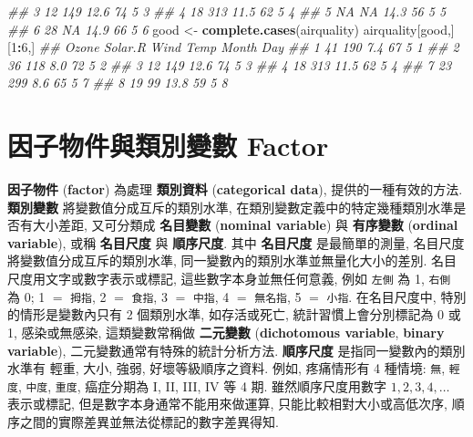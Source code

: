\documentclass[
]{book}
\newenvironment{Shaded}{\begin{snugshade}}{\end{snugshade}}
\newcommand{\CommentTok}[1]{\textcolor[rgb]{0.56,0.35,0.01}{\textit{#1}}}
\newcommand{\DecValTok}[1]{\textcolor[rgb]{0.00,0.00,0.81}{#1}}
\newcommand{\KeywordTok}[1]{\textcolor[rgb]{0.13,0.29,0.53}{\textbf{#1}}}
\newcommand{\NormalTok}[1]{#1}
\newcommand{\OperatorTok}[1]{\textcolor[rgb]{0.81,0.36,0.00}{\textbf{#1}}}
\newcommand{\StringTok}[1]{\textcolor[rgb]{0.31,0.60,0.02}{#1}}
\begin{document}
\begin{Shaded}
\begin{Highlighting}[]
\CommentTok{\#\# 3    12     149 12.6   74     5   3}
\CommentTok{\#\# 4    18     313 11.5   62     5   4}
\CommentTok{\#\# 5    NA      NA 14.3   56     5   5}
\CommentTok{\#\# 6    28      NA 14.9   66     5   6}
\NormalTok{good  \textless{}{-}}\StringTok{  }\KeywordTok{complete.cases}\NormalTok{(airquality)}
\NormalTok{airquality[good,][}\DecValTok{1}\OperatorTok{:}\DecValTok{6}\NormalTok{,]}
\CommentTok{\#\#   Ozone Solar.R Wind Temp Month Day}
\CommentTok{\#\# 1    41     190  7.4   67     5   1}
\CommentTok{\#\# 2    36     118  8.0   72     5   2}
\CommentTok{\#\# 3    12     149 12.6   74     5   3}
\CommentTok{\#\# 4    18     313 11.5   62     5   4}
\CommentTok{\#\# 7    23     299  8.6   65     5   7}
\CommentTok{\#\# 8    19      99 13.8   59     5   8}
\end{Highlighting}
\end{Shaded}

\hypertarget{ux56e0ux5b50ux7269ux4ef6ux8207ux985eux5225ux8b8aux6578-factor}{%
\section{因子物件與類別變數 Factor}\label{ux56e0ux5b50ux7269ux4ef6ux8207ux985eux5225ux8b8aux6578-factor}}

\textbf{因子物件}
(\textbf{factor})
為處理
\textbf{類別資料}
(\textbf{categorical data}),
提供的一種有效的方法.
\textbf{類別變數}
將變數值分成互斥的類別水準,
在類別變數定義中的特定幾種類別水準是否有大小差距,
又可分類成
\textbf{名目變數}
(\textbf{nominal variable})
與
\textbf{有序變數}
(\textbf{ordinal variable}),
或稱
\textbf{名目尺度}
與
\textbf{順序尺度}.
其中
\textbf{名目尺度}
是最簡單的測量,
名目尺度將變數值分成互斥的類別水準,
同一變數內的類別水準並無量化大小的差別.
名目尺度用文字或數字表示或標記, 這些數字本身並無任何意義,
例如 \texttt{左側} 為 1, \texttt{右側} 為 0;
1 \(=\) \texttt{拇指}, 2 \(=\) \texttt{食指}, 3 \(=\) \texttt{中指}, 4 \(=\) \texttt{無名指}, 5 \(=\) \texttt{小指}.
在名目尺度中,
特別的情形是變數內只有 2 個類別水準,
如存活或死亡, 統計習慣上會分別標記為 0 或 1,
感染或無感染, 這類變數常稱做
\textbf{二元變數}
(\textbf{dichotomous variable},
\textbf{binary variable}),
二元變數通常有特殊的統計分析方法.
\textbf{順序尺度}
是指同一變數內的類別水準有
輕重, 大小, 強弱, 好壞等級順序之資料.
例如, 疼痛情形有 4 種情境: \texttt{無}, \texttt{輕度}, \texttt{中度}, \texttt{重度},
癌症分期為 I, II, III, IV 等 4 期.
雖然順序尺度用數字 \(1, 2, 3, 4, \ldots\) 表示或標記,
但是數字本身通常不能用來做運算, 只能比較相對大小或高低次序,
順序之間的實際差異並無法從標記的數字差異得知.
\end{document}

